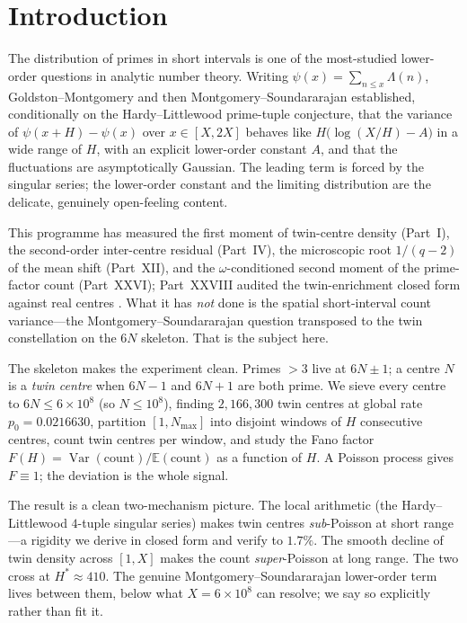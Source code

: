 \documentclass[11pt]{article}
\theoremstyle{definition}
\newcommand{\Var}{\operatorname{Var}}
\newcommand{\E}{\mathbb{E}}
\begin{document}
\section{Introduction}
The distribution of primes in short intervals is one of the most-studied lower-order questions in
analytic number theory. Writing $\psi(x)=\sum_{n\le x}\Lambda(n)$, Goldston--Montgomery and then
Montgomery--Soundararajan \cite{MS} established, conditionally on the Hardy--Littlewood prime-tuple
conjecture, that the variance of $\psi(x+H)-\psi(x)$ over $x\in[X,2X]$ behaves like
$H\bigl(\log(X/H)-A\bigr)$ in a wide range of $H$, with an explicit lower-order constant $A$, and that
the fluctuations are asymptotically Gaussian. The leading term is forced by the singular series; the
lower-order constant and the limiting distribution are the delicate, genuinely open-feeling content.

This programme has measured the first moment of twin-centre density (Part~I), the second-order
inter-centre residual (Part~IV), the microscopic root $1/(q-2)$ of the mean shift (Part~XII), and the
$\omega$-conditioned second moment of the prime-factor count (Part~XXVI); Part~XXVIII audited the
twin-enrichment closed form against real centres \cite{PXXVIII}. What it has \emph{not} done is the
spatial short-interval count variance---the Montgomery--Soundararajan question transposed to the twin
constellation on the $6N$ skeleton. That is the subject here.

The skeleton makes the experiment clean. Primes $>3$ live at $6N\pm1$; a centre $N$ is a
\emph{twin centre} when $6N-1$ and $6N+1$ are both prime. We sieve every centre to
$6N\le 6\times10^{8}$ (so $N\le 10^{8}$), finding $2{,}166{,}300$ twin centres at global rate
$p_{0}=0.0216630$, partition $[1,N_{\max}]$ into disjoint windows of $H$ consecutive centres, count
twin centres per window, and study the Fano factor $F(H)=\Var(\text{count})/\E(\text{count})$ as a
function of $H$. A Poisson process gives $F\equiv1$; the deviation is the whole signal.

The result is a clean two-mechanism picture. The local arithmetic (the Hardy--Littlewood $4$-tuple
singular series) makes twin centres \emph{sub}-Poisson at short range---a rigidity we derive in closed
form and verify to $1.7\%$. The smooth decline of twin density across $[1,X]$ makes the count
\emph{super}-Poisson at long range. The two cross at $H^{\ast}\approx410$. The genuine
Montgomery--Soundararajan lower-order term lives between them, below what $X=6\times10^{8}$ can
resolve; we say so explicitly rather than fit it.
\end{document}
